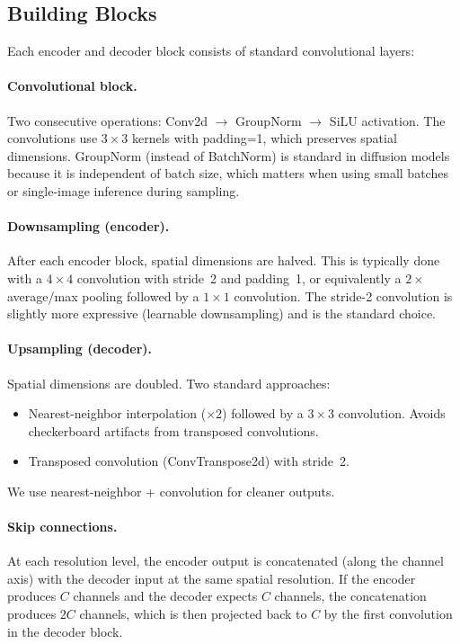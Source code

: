 \documentclass[11pt]{article}
\begin{document}
\subsection{Building Blocks}

Each encoder and decoder block consists of standard convolutional layers:

\paragraph{Convolutional block.}
Two consecutive operations: Conv2d $\to$ GroupNorm $\to$ SiLU activation.
The convolutions use $3\times3$ kernels with padding=1, which preserves spatial
dimensions. GroupNorm (instead of BatchNorm) is standard in diffusion models
because it is independent of batch size, which matters when using small batches
or single-image inference during sampling.

\paragraph{Downsampling (encoder).}
After each encoder block, spatial dimensions are halved. This is typically done
with a $4\times4$ convolution with stride~2 and padding~1, or equivalently a
$2\times$ average/max pooling followed by a $1\times1$ convolution. The stride-2
convolution is slightly more expressive (learnable downsampling) and is the
standard choice.

\paragraph{Upsampling (decoder).}
Spatial dimensions are doubled. Two standard approaches:
\begin{itemize}[nosep]
    \item Nearest-neighbor interpolation ($\times2$) followed by a $3\times3$ convolution.
          Avoids checkerboard artifacts from transposed convolutions.
    \item Transposed convolution (ConvTranspose2d) with stride~2.
\end{itemize}
We use nearest-neighbor + convolution for cleaner outputs.

\paragraph{Skip connections.}
At each resolution level, the encoder output is concatenated (along the channel
axis) with the decoder input at the same spatial resolution. If the encoder
produces $C$ channels and the decoder expects $C$ channels, the concatenation
produces $2C$ channels, which is then projected back to $C$ by the first
convolution in the decoder block.
\end{document}
